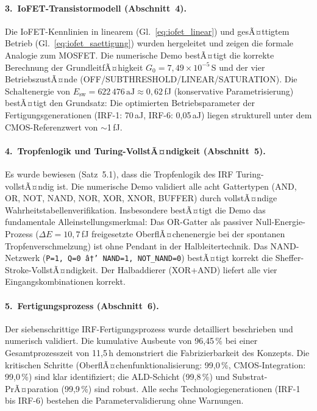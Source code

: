 ﻿\documentclass[a4paper,12pt]{scrreprt}
\theoremstyle{definition}
\begin{document}
\paragraph{3.~IoFET-Transistormodell (Abschnitt~4).}
Die IoFET-Kennlinien in linearem (Gl.~\ref{eq:iofet_linear}) und
gesÃ¤ttigtem Betrieb (Gl.~\ref{eq:iofet_saettigung}) wurden hergeleitet
und zeigen die formale Analogie zum MOSFET. Die numerische Demo
bestÃ¤tigt die korrekte Berechnung der GrundleitfÃ¤higkeit
$G_0 = 7{,}49 \times 10^{-5}$\,S und der vier BetriebszustÃ¤nde
(OFF/SUBTHRESHOLD/LINEAR/SATURATION). Die Schaltenergie von
$E_\text{sw} = 622\,476\,\text{aJ} \approx 0{,}62$\,fJ (konservative
Parametrisierung) bestÃ¤tigt den Grundsatz: Die optimierten
Betriebsparameter der Fertigungsgenerationen (IRF-1: 70\,aJ,
IRF-6: 0,05\,aJ) liegen strukturell unter dem CMOS-Referenzwert
von $\sim$1\,fJ.

\paragraph{4.~Tropfenlogik und Turing-VollstÃ¤ndigkeit (Abschnitt~5).}
Es wurde bewiesen (Satz~5.1), dass die Tropfenlogik des IRF
Turing-vollstÃ¤ndig ist. Die numerische Demo validiert alle acht
Gattertypen (AND, OR, NOT, NAND, NOR, XOR, XNOR, BUFFER) durch
vollstÃ¤ndige Wahrheitstabellenverifikation. Insbesondere bestÃ¤tigt
die Demo das fundamentale Alleinstellungsmerkmal: Das OR-Gatter
als passiver Null-Energie-Prozess ($\Delta E = 10{,}7$\,fJ
freigesetzte OberflÃ¤chenenergie bei der spontanen Tropfenver\-schmelzung)
ist ohne Pendant in der Halbleitertechnik. Das NAND-Netzwerk
(\texttt{P=1, Q=0 â†’ NAND=1, NOT\_NAND=0}) bestÃ¤tigt korrekt
die Sheffer-Stroke-VollstÃ¤ndigkeit. Der Halbaddierer (XOR+AND)
liefert alle vier Eingangskombinationen korrekt.

\paragraph{5.~Fertigungsprozess (Abschnitt~6).}
Der siebenschrittige IRF-Fertigungsprozess wurde detailliert beschrieben
und numerisch validiert. Die kumulative Ausbeute von 96,45\,\%
bei einer Gesamtprozesszeit von 11,5\,h demonstriert die
Fabrizierbarkeit des Konzepts. Die kritischen Schritte
(OberflÃ¤chenfunktionalisierung: 99,0\,\%, CMOS-Integration: 99,0\,\%)
sind klar identifiziert; die ALD-Schicht (99,8\,\%) und
Substrat-PrÃ¤paration (99,9\,\%) sind robust. Alle sechs
Technologiegenerationen (IRF-1 bis IRF-6) bestehen die
Parametervalidierung ohne Warnungen.
\end{document}
